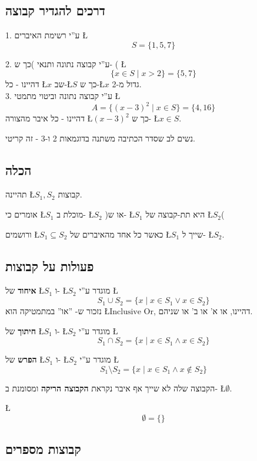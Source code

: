\documentclass[english,hebrew]{article}
\begin{document}
\subsection{דרכים להגדיר קבוצה}

1. ע\textquotedblright י רשימת האיברים \L{%
\[
S=\{1,5,7\}
\]
}%

2. ע\textquotedblright י קבוצה נתונה ותנאי )כך ש- ( \L{%
\[
\{x\in S\mid x>2\}=\{5,7\}
\]
}%
דהיינו - כל \L{$x$} שב-\L{$S$} כך ש-\L{$x$} גדול מ-2.\\

3. ע\textquotedblright י קבוצה נתונה וביטוי מתמטי \L{%
\[
A=\{(x-3)^{2}\mid x\in S\}=\{4,16\}
\]
}%
דהיינו - כל איבר מהצורה \L{$(x-3)^{2}$} כך ש- \L{$x\in S$}.

נשים לב שסדר הכתיבה משתנה בדוגמאות 2 ו-3 - זה קריטי.

\subsection{הכלה}

תהיינה \L{$S_{1},S_{2}$} קבוצות.

אומרים כי \L{$S_{1}$} מוכלת ב- \L{$S_{2}$} )או ש- \L{$S_{1}$} היא
תת-קבוצה של \L{$S_{2}$}(

ורושמים \L{$S_{1}\subseteq S_{2}$} כאשר כל אחד מהאיברים של \L{$S_{1}$}
שייך ל- \L{$S_{2}$}.

\subsection{פעולות על קבוצות}

\textbf{איחוד} של \L{$S_{1}$} ו- \L{$S_{2}$} מוגדר ע\textquotedblright י
\L{%
\[
S_{1}\cup S_{2}=\{x\mid x\in S_{1}\lor x\in S_{2}\}
\]
}%
נזכור ש- \textquotedblright או\textquotedblright{} במתמטיקה הוא \L{$\text{Inclusive Or}$},
דהיינו, או א' או ב' או שניהם.

\textbf{חיתוך} של \L{$S_{1}$} ו- \L{$S_{2}$} מוגדר ע\textquotedblright י
\L{%
\[
S_{1}\cap S_{2}=\{x\mid x\in S_{1}\land x\in S_{2}\}
\]
}%

\textbf{הפרש} של \L{$S_{1}$} ו- \L{$S_{2}$} מוגדר ע\textquotedblright י
\L{%
\[
S_{1}\setminus S_{2}=\{x\mid x\in S_{1}\land x\notin S_{2}\}
\]
}%

הקבוצה שלה לא שייך אף איבר נקראת \textbf{הקבוצה הריקה} ומסומנת ב-
\L{$\emptyset$}.

\L{%
\[
\emptyset=\{\}
\]
}%

\subsection{קבוצות מספרים}
\end{document}
